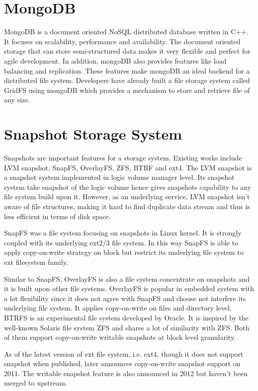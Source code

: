 \section{MongoDB}

    MongoDB is a document oriented NoSQL distributed database written in C++. It focuses on scalability, performance and availability. The document oriented storage that can store semi-structured data makes it very flexible and perfect for agile development. In addition, mongoDB also provides features like load balancing and replication. These features make mongoDB an ideal backend for a distributed file system. Developers have already built a file storage system called GridFS using mongoDB which provides a mechanism to store and retrieve file of any size.

\section{Snapshot Storage System}

    Snapshots are important features for a storage system. Existing works include LVM snapshot, SnapFS, OverlayFS, ZFS, BTRF and ext4.
The LVM snapshot is a snapshot system implemented in logic volume manager level. Its snapshot system take snapshot of the logic volume hence gives snapshots capability to any file system build upon it. However, as an underlying service, LVM snapshot isn’t aware of file structures, making it hard to find duplicate data stream and thus is less efficient in terms of disk space.
    
    SnapFS was a file system focusing on snapshots in Linux kernel. It is strongly coupled with its underlying ext2/3 file system. In this way SnapFS is able to apply copy-on-write strategy on block but restrict its underlying file system to ext filesystem family. 
    
    Similar to SnapFS, OverlayFS is also a file system concentrate on snapshots and it is built upon other file systems. OverlayFS is popular in embedded system with a lot flexibility since it does not agree with SnapFS and choose not interfere its underlying file system. It applies copy-on-write on files and directory level.
BTRFS is an experimental file system developed by Oracle. It is inspired by the well-known Solaris file system ZFS and shares a lot of similarity with ZFS. Both of them support copy-on-write writable snapshots at block level granularity.
    
    As of the latest version of ext file system, i.e. ext4, though it does not support snapshot when published, later announces copy-on-write snapshot support on 2011. The writable snapshot feature is also announced in 2012 but haven’t been merged to upstream.

